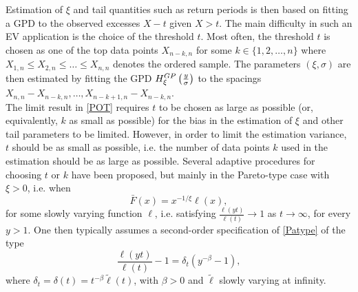 \documentclass[twoside,leqno,11pt]{article}
\begin{document}
Estimation of $\xi$ and tail quantities such as return periods is then based on fitting a GPD to the observed excesses $X-t$ given $X>t$.
The main difficulty in such an EV application is the choice of the threshold $t$. Most often, the threshold $t$ is chosen as one of the top data points $X_{n-k,n}$ for some $k \in \{1,2, \ldots,n \}$ where $X_{1,n} \leq X_{2,n} \leq \ldots \leq X_{n,n}$ denotes the ordered sample. 
The parameters $(\xi,\sigma)$ are then estimated by fitting the GPD $H_{\xi}^{GP}\left({y \over \sigma} \right)$ to the spacings $X_{n,n}-X_{n-k,n},\ldots, X_{n-k+1,n}-X_{n-k,n}$.
\\ 


The limit result in \eqref{POT}  requires $t$ to be chosen as large as possible (or, equivalently, $k$ as small as possible) for the bias in the estimation of $\xi$ and other tail parameters to be limited. However, in order to limit the estimation variance, $t$ should be as small as possible, i.e. the number of data points $k$  used in the estimation should be as large as possible. Several adaptive procedures for choosing $t$ or $k$ have been proposed, but mainly in the Pareto-type case with $\xi >0$, i.e. when
\begin{equation}
\bar{F}(x) = x^{-1/\xi}\ell (x),
\label{Patype}
\end{equation} 
for some slowly varying function $\ell$, i.e. satisfying $\frac{\ell(yt)}{\ell (t)} \to 1 $ as $t \to \infty$, for every $y>1$. One then typically assumes a second-order specification of \eqref{Patype} of the type
\begin{equation}
\frac{\ell(yt)}{\ell (t)} - 1 =\delta_t 
\left( y^{-\beta}-1 \right),
\label{SO}
\end{equation}
where $\delta_t=\delta (t)= t^{-\beta}\tilde{\ell}(t)$, with $\beta >0$ and $\tilde\ell$ slowly varying at infinity.
\\
\end{document}

